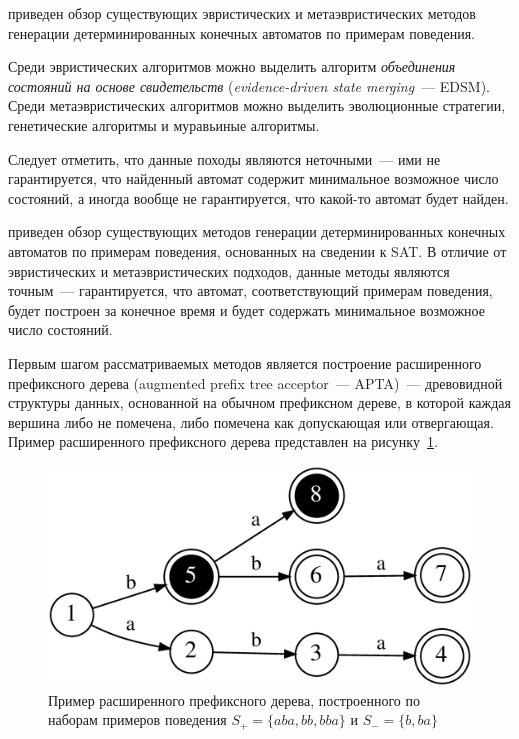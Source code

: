 \insection{\ref{sec:review:heuristic-dfa-inf}} приведен обзор существующих эвристических и метаэвристических методов генерации детерминированных конечных автоматов по примерам поведения. 

Среди эвристических алгоритмов можно выделить алгоритм \emph{объединения состояний на основе свидетельств} (\emph{evidence-driven state merging}~--- EDSM).
Среди метаэвристических алгоритмов можно выделить эволюционные стратегии, генетические алгоритмы и муравьиные алгоритмы.

Следует отметить, что данные походы являются неточными~--- ими не гарантируется, что найденный автомат содержит минимальное возможное число состояний, а иногда вообще не гарантируется, что какой-то автомат будет найден.


\insection{\ref{sec:review:sat-dfa-inf}} приведен обзор существующих методов генерации детерминированных конечных автоматов по примерам поведения, основанных на сведении к SAT. В отличие от эвристических и метаэвристических подходов, данные методы являются точным~--- гарантируется, что автомат, соответствующий примерам поведения, будет построен за конечное время и будет содержать минимальное возможное число состояний.

Первым шагом рассматриваемых методов является построение расширенного префиксного дерева (augmented prefix tree acceptor~--- APTA)~--- древовидной структуры данных, основанной на обычном префиксном дереве, в которой каждая вершина либо не помечена, либо помечена как допускающая или отвергающая. 
Пример расширенного префиксного дерева представлен на рисунку~\ref{syn:img:apta-ex}.

\begin{figure}[ht]
  \centering
  \includegraphics[scale=0.14]{img/datamod/FIG2a.eps}
  \caption{Пример расширенного префиксного дерева, построенного по наборам примеров поведения $S_{+} = \{aba, bb, bba\}$ и $S_{-} = \{b, ba\}$}
  \label{syn:img:apta-ex}
\end{figure}

